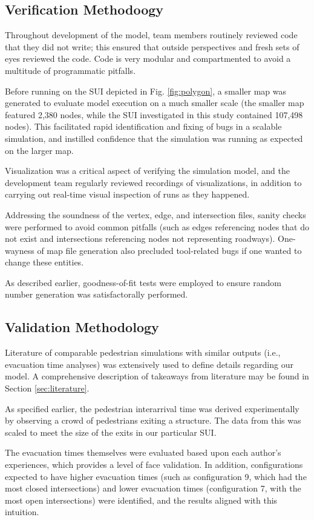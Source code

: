\documentclass[12pt]{article}
\begin{document}
\subsection{Verification Methodoogy}
Throughout development of the model, team members routinely reviewed code
that they did not write; this ensured that outside perspectives and fresh
sets of eyes reviewed the code.  Code is very modular and compartmented to avoid
a multitude of programmatic pitfalls.

Before running on the SUI depicted in Fig. \ref{fig:polygon}, a smaller map
was generated to evaluate model execution on a much smaller scale (the smaller
map featured 2,380 nodes, while the SUI investigated in this study contained
107,498 nodes). This facilitated rapid identification and fixing of bugs in
a scalable simulation, and instilled confidence that the simulation was running
as expected on the larger map.

Visualization was a critical aspect of verifying the simulation model, and
the development team regularly reviewed recordings of visualizations, in
addition to carrying out real-time visual inspection of runs as they happened.

Addressing the soundness of the vertex, edge, and intersection files, sanity
checks were performed to avoid common pitfalls (such as edges referencing
nodes that do not exist and intersections referencing nodes not representing
roadways). One-wayness of map file generation also precluded tool-related
bugs if one wanted to change these entities.

As described earlier, goodness-of-fit tests were employed to ensure random
number generation was satisfactorally performed.

\subsection{Validation Methodology}
Literature of comparable pedestrian simulations with similar outputs (i.e.,
evacuation time analyses) was extensively used to define details regarding
our model. A comprehensive description of takeaways from literature may be
found in Section \ref{sec:literature}.

As specified earlier, the pedestrian interarrival time was derived
experimentally by observing a crowd of pedestrians exiting a structure. The
data from this was scaled to meet the size of the exits in our particular SUI.

The evacuation times themselves were evaluated based upon each author's
experiences, which provides a level of face validation. In addition,
configurations expected to have higher evacuation times (such as configuration
9, which had the most closed intersections) and lower evacuation times
(configuration 7, with the most open intersections) were identified, and the
results aligned with this intuition.
\end{document}
